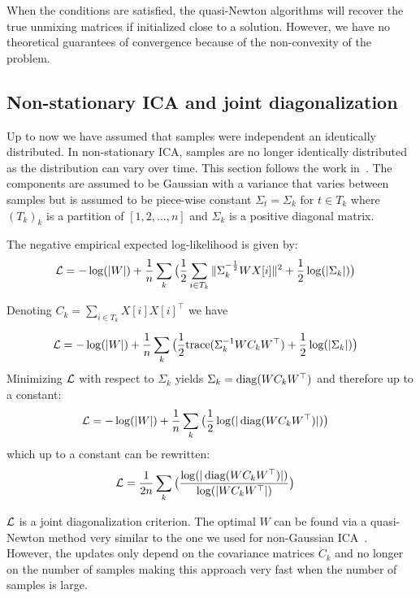 When the conditions are satisfied, the quasi-Newton algorithms will recover the
true unmixing matrices if initialized close to a solution. However, we have no
theoretical guarantees of convergence because of the non-convexity of the problem.

\subsection{Non-stationary ICA and joint diagonalization}
Up to now we have assumed that samples were independent an identically distributed. In non-stationary ICA, samples are no longer identically distributed as the distribution can vary over time.
This section follows the work in~\cite{pham2001blind}.
The components are assumed to be Gaussian with a variance that varies between
samples but is assumed to be piece-wise constant $\Sigma_t = \Sigma_k$ for $t \in
T_k$ where $(T_k)_k$ is a partition of $[1, 2, \dots, n]$ and $\Sigma_k$ is a
positive diagonal matrix.

The negative empirical expected log-likelihood is given by:
\begin{align}  
  \mathcal{L} &= -\log(|W|)  + \frac1{n} \sum_k \big( \frac12 \sum_{i \in T_k}\|\Sigma_k^{-\frac12} W X[i] \|^2 + \frac12 \log(|\Sigma_k|) \big)
\end{align}

Denoting $C_k = \sum_{i \in T_k} X[i] X[i]^{\top}$ we have 

\begin{align}  
  \mathcal{L} &= -\log(|W|)  + \frac1{n} \sum_k \big( \frac1{2} {\mathrm{ trace}}(\Sigma_k^{-1} W C_k W^{\top}) + \frac12 \log(|\Sigma_k|) \big)
\end{align}
Minimizing $\mathcal{L}$ with respect to $\Sigma_k$ yields $\Sigma_k = \operatorname*{diag}(W C_k
W^{\top})$ and therefore up to a constant:
\begin{align}  
  \mathcal{L} &= -\log(|W|)  + \frac1{n} \sum_k \big(\frac12 \log(|\operatorname*{diag}(W C_k W^{\top})|) \big)
\end{align}
which up to a constant can be rewritten:
\begin{align}  
  \mathcal{L} &=\frac1{2n} \sum_k \big(\frac{\log(|\operatorname*{diag}(W C_k W^{\top})|)}{\log(|W C_k W^{\top}|)} \big) \label{jointdiagcritica}
\end{align}

$\mathcal{L}$ is a joint diagonalization criterion. The optimal $W$ can be found via a
quasi-Newton method very similar to the one we used for non-Gaussian
ICA~\cite{ablin2018beyond}. However, the updates only depend on the covariance
matrices $C_k$ and no longer on the number of samples making this approach very
fast when the number of samples is large.

